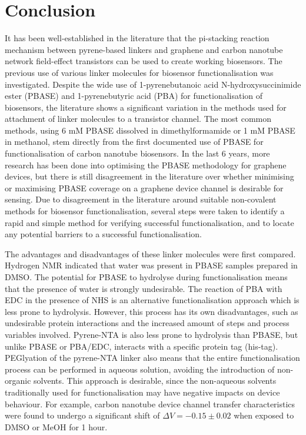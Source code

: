 \documentclass[
  a4paper,
]{scrbook}
\begin{document}
\hypertarget{sec-conclusion}{%
\section{Conclusion}\label{sec-conclusion}}

It has been well-established in the literature that the pi-stacking
reaction mechanism between pyrene-based linkers and graphene and carbon
nanotube network field-effect transistors can be used to create working
biosensors. The previous use of various linker molecules for biosensor
functionalisation was investigated. Despite the wide use of
1-pyrenebutanoic acid N-hydroxysuccinimide ester (PBASE) and
1-pyrenebutyric acid (PBA) for functionalisation of biosensors, the
literature shows a significant variation in the methods used for
attachment of linker molecules to a transistor channel. The most common
methods, using 6 mM PBASE dissolved in dimethylformamide or 1 mM PBASE
in methanol, stem directly from the first documented use of PBASE for
functionalisation of carbon nanotube biosensors. In the last 6 years,
more research has been done into optimising the PBASE methodology for
graphene devices, but there is still disagreement in the literature over
whether minimising or maximising PBASE coverage on a graphene device
channel is desirable for sensing. Due to disagreement in the literature
around suitable non-covalent methods for biosensor functionalisation,
several steps were taken to identify a rapid and simple method for
verifying successful functionalisation, and to locate any potential
barriers to a successful functionalisation.

The advantages and disadvantages of these linker molecules were first
compared. Hydrogen NMR indicated that water was present in PBASE samples
prepared in DMSO. The potential for PBASE to hydrolyse during
functionalisation means that the presence of water is strongly
undesirable. The reaction of PBA with EDC in the presence of NHS is an
alternative functionalisation approach which is less prone to
hydrolysis. However, this process has its own disadvantages, such as
undesirable protein interactions and the increased amount of steps and
process variables involved. Pyrene-NTA is also less prone to hydrolysis
than PBASE, but unlike PBASE or PBA/EDC, interacts with a specific
protein tag (his-tag). PEGlyation of the pyrene-NTA linker also means
that the entire functionalisation process can be performed in aqueous
solution, avoiding the introduction of non-organic solvents. This
approach is desirable, since the non-aqueous solvents traditionally used
for functionalisation may have negative impacts on device behaviour. For
example, carbon nanotube device channel transfer characteristics were
found to undergo a significant shift of \(\Delta V = -0.15 \pm 0.02\)
when exposed to DMSO or MeOH for 1 hour.
\end{document}
